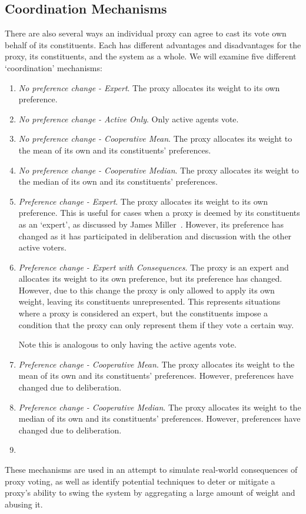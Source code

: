 \subsection{Coordination Mechanisms}\label{subsec:coordination-mechanisms}
There are also several ways an individual proxy can agree to cast its vote own behalf
of its constituents.
Each has different advantages and disadvantages for the proxy, its constituents, and
the system as a whole.
We will examine five different `coordination' mechanisms:
\begin{enumerate}
    \item {
        \textit{No preference change - Expert}.
        The proxy allocates its weight to its own preference.  
    }
    \item {
        \textit{No preference change - Active Only}.
        Only active agents vote.
    }
    \item {
        \textit{No preference change - Cooperative Mean}.
        The proxy allocates its weight to the mean of its own and its constituents'
        preferences.
    }
    \item {
        \textit{No preference change - Cooperative Median}.
        The proxy allocates its weight to the median of its own and its constituents'
        preferences.
    }
    \item {
        \textit{Preference change - Expert}.
        The proxy allocates its weight to its own preference.
        This is useful for cases when a proxy is deemed by its constituents as an
        `expert', as discussed by James Miller~\cite{Miller1969}.
        However, its preference has changed as it has participated in deliberation
        and discussion with the other active voters.  
    }
    \item {
        \textit{Preference change - Expert with Consequences}.
        The proxy is an expert and allocates its weight to its own preference, but its
        preference has changed.
        However, due to this change the proxy is only allowed to apply its own
        weight, leaving its constituents unrepresented.
        This represents situations where a proxy is considered an expert, but the
        constituents impose a condition that the proxy can only represent them if
        they vote a certain way.

        Note this is analogous to only having the active agents vote.
    }
    \item {
        \textit{Preference change - Cooperative Mean}.
        The proxy allocates its weight to the mean of its own and its constituents'
        preferences.
        However, preferences   have changed due to deliberation.
    }
    \item {
        \textit{Preference change - Cooperative Median}.
        The proxy allocates its weight to the median of its own and its constituents'
        preferences.
        However, preferences have changed due to deliberation.
    }
    \item{}
\end{enumerate}
These mechanisms are used in an attempt to simulate real-world consequences of proxy
voting, as well as identify potential techniques to deter or mitigate a proxy's
ability to swing the system by aggregating a large amount of weight and abusing it.
